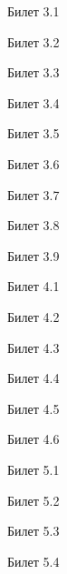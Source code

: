 \documentclass[a4paper,12pt]{article}
\begin{document}
\newpage
\begin{mybox}{\hypertarget{bil3_1}{Билет 3.1}}
\end{mybox}
\newpage
\begin{mybox2}{\hypertarget{bil3_2}{Билет 3.2}}
\end{mybox2}
\newpage
\begin{mybox}{\hypertarget{bil3_3}{Билет 3.3}}
\end{mybox}
\newpage
\begin{mybox2}{\hypertarget{bil3_4}{Билет 3.4}}
\end{mybox2}
\newpage
\begin{mybox}{\hypertarget{bil3_5}{Билет 3.5}}
\end{mybox}
\newpage
\begin{mybox2}{\hypertarget{bil3_6}{Билет 3.6}}
\end{mybox2}
\newpage
\begin{mybox}{\hypertarget{bil3_7}{Билет 3.7}}
\end{mybox}
\newpage
\begin{mybox2}{\hypertarget{bil3_8}{Билет 3.8}}
\end{mybox2}
\newpage
\begin{mybox}{\hypertarget{bil3_9}{Билет 3.9}}
\end{mybox}
\newpage
\begin{mybox2}{\hypertarget{bil4_1}{Билет 4.1}}
\end{mybox2}
\newpage
\begin{mybox}{\hypertarget{bil4_2}{Билет 4.2}}
\end{mybox}
\newpage
\begin{mybox2}{\hypertarget{bil4_3}{Билет 4.3}}
\end{mybox2}
\newpage
\begin{mybox}{\hypertarget{bil4_4}{Билет 4.4}}
\end{mybox}
\newpage
\begin{mybox2}{\hypertarget{bil4_5}{Билет 4.5}}
\end{mybox2}
\newpage
\begin{mybox}{\hypertarget{bil4_6}{Билет 4.6}}
\end{mybox}


\newpage
\begin{mybox2}{\hypertarget{bil5_1}{Билет 5.1}}
\end{mybox2}
\newpage
\begin{mybox}{\hypertarget{bil5_2}{Билет 5.2}}
\end{mybox}
\newpage
\begin{mybox2}{\hypertarget{bil5_3}{Билет 5.3}}
\end{mybox2}
\newpage
\begin{mybox}{\hypertarget{bil5_4}{Билет 5.4}}
\end{mybox}
\end{document}

